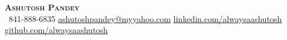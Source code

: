 \begin{center}
    \textbf{\Huge \scshape Ashutosh Pandey} \\ \vspace{1pt}
     \ \small 841-888-6835 \quad
    \href{mailto:ashutoshpandey@myyahoo.com}{ \underline{ashutoshpandey@myyahoo.com}} \quad
    \href{https://www.linkedin.com/in/alwaysaashutosh}{ \underline{linkedin.com/alwaysaashutosh}} \quad \\ \vspace{1pt}
    \href{https://github.com/alwaysaashutosh}{ \underline{github.com/alwaysaashutosh}}
\end{center}
